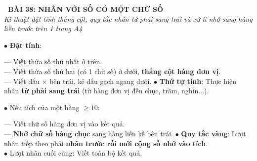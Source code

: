 \documentclass[14pt,a4paper,oneside]{extbook}
\begin{document}
\noindent
\begin{tcolorbox}[
  enhanced,
  colback=teal!8!white,
  colframe=teal!80!black,
  arc=3mm, boxrule=1pt,
  left=3mm, right=3mm, top=2mm, bottom=2mm,
  halign=center
]
  {\Large\bfseries\color{teal!90!black}\faBookmark\ BÀI 38: NHÂN VỚI SỐ CÓ MỘT CHỮ SỐ}\\[1.5pt]
  {\footnotesize\itshape\color{black!75} Kĩ thuật đặt tính thẳng cột, quy tắc nhân từ phải sang trái và xử lí nhớ sang hàng liền trước trên 1 trang A4}
\end{tcolorbox}

\vspace{2mm}

\noindent
\begin{minipage}[t]{0.49\textwidth}
  \begin{tcolorbox}[
    enhanced,
    title={\footnotesize\bfseries\color{white}\faPencil\ 1. Đặt tính \& Thứ tự thực hiện},
    colback=blue!2!white,
    colframe=blue!75!black,
    arc=2.5mm, boxrule=0.8pt, top=1.8mm, bottom=1.8mm, left=2mm, right=2mm
  ]
    \footnotesize
    $\bullet$ \textbf{Đặt tính}:
    \par
    --- Viết thừa số thứ nhất ở trên.\\
    --- Viết thừa số thứ hai (có 1 chữ số) ở dưới, \textbf{thẳng cột hàng đơn vị}.\\
    --- Viết dấu $\times$ bên trái, kẻ dấu gạch ngang dưới.
    $\bullet$ \textbf{Thứ tự tính}: Thực hiện nhân \textbf{từ phải sang trái} (từ hàng đơn vị đến chục, trăm, nghìn...).
  \end{tcolorbox}
\end{minipage}%
\hfill
\begin{minipage}[t]{0.49\textwidth}
  \begin{tcolorbox}[
    enhanced,
    title={\footnotesize\bfseries\color{white}\faLightbulbO\ 2. Kĩ thuật nhân có nhớ},
    colback=teal!2!white,
    colframe=teal!75!black,
    arc=2.5mm, boxrule=0.8pt, top=1.8mm, bottom=1.8mm, left=2mm, right=2mm
  ]
    \footnotesize
    $\bullet$ Nếu tích của một hàng $\ge 10$:
    \par
    --- Viết chữ số hàng đơn vị vào kết quả.\\
    --- \textbf{Nhớ chữ số hàng chục} sang hàng liền kề bên trái.
    $\bullet$ \textbf{Quy tắc vàng}: Lượt nhân tiếp theo phải \textbf{nhân trước rồi mới cộng số nhớ vào tích}.\\
    $\bullet$ Lượt nhân cuối cùng: Viết toàn bộ kết quả.
  \end{tcolorbox}
\end{minipage}
\end{document}
